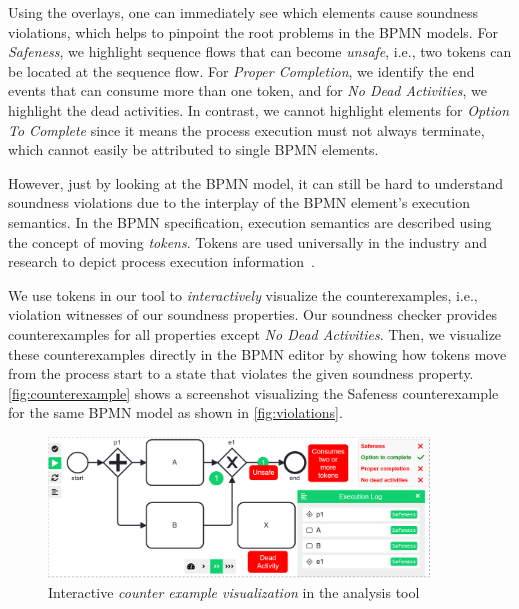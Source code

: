 \documentclass[runningheads]{llncs}
\begin{document}
Using the overlays, one can immediately see which elements cause soundness violations, which helps to pinpoint the root problems in the BPMN models.
For \textit{Safeness}, we highlight sequence flows that can become \textit{unsafe}, i.e., two tokens can be located at the sequence flow.
For \textit{Proper Completion}, we identify the end events that can consume more than one token, and for \textit{No Dead Activities}, we highlight the dead activities.
In contrast, we cannot highlight elements for \textit{Option To Complete} since it means the process execution must not always terminate, which cannot easily be attributed to single BPMN elements.

However, just by looking at the BPMN model, it can still be hard to understand soundness violations due to the interplay of the BPMN element's execution semantics.
In the BPMN specification, execution semantics are described using the concept of moving \textit{tokens}.
Tokens are used universally in the industry and research to depict process execution information~\cite{camundaservicesgmbhBpmnjsTokenSimulation2024,corradiniFormalApproachAnalysis2021,corradiniFormalisingAnimatingMultiple2022,houhouFirstOrderLogicVerification2022,krauterFormalizationAnalysisBPMN2023,krauterHigherorderTransformationApproach2023}.

We use tokens in our tool to \textit{interactively} visualize the counterexamples, i.e., violation witnesses of our soundness properties.
Our soundness checker provides counterexamples for all properties except \textit{No Dead Activities}.
Then, we visualize these counterexamples directly in the BPMN editor by showing how tokens move from the process start to a state that violates the given soundness property.
\autoref{fig:counterexample} shows a screenshot visualizing the Safeness counterexample for the same BPMN model as shown in \autoref{fig:violations}.

\begin{figure}[ht]
	\centering
	\includegraphics[width=0.9\textwidth]{images/counter-example}
	\caption{Interactive \textit{counter example visualization} in the analysis tool}
	\label{fig:counterexample}
\end{figure}
\end{document}
